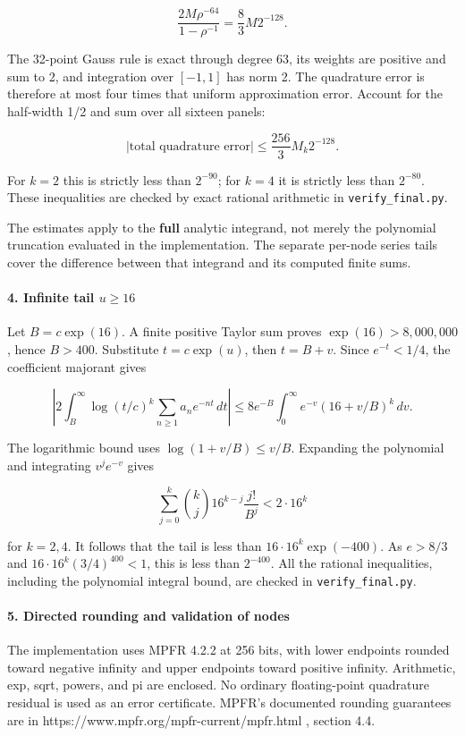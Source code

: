\documentclass[11pt]{article}
\begin{document}
\[
\frac{2M\rho^{-64}}{1-\rho^{-1}}=\frac83 M2^{-128}.
\]

The 32-point Gauss rule is exact through degree 63, its weights are positive and sum to 2, and integration over \([-1,1]\) has norm 2. The quadrature error is therefore at most four times that uniform approximation error. Account for the half-width 1/2 and sum over all sixteen panels:

\[
|\text{total quadrature error}|\le \frac{256}{3}M_k2^{-128}.
\]

For \(k=2\) this is strictly less than \(2^{-90}\); for \(k=4\) it is strictly less than \(2^{-80}\). These inequalities are checked by exact rational arithmetic in \nolinkurl{verify_final.py}.

The estimates apply to the \textbf{full} analytic integrand, not merely the polynomial truncation evaluated in the implementation. The separate per-node series tails cover the difference between that integrand and its computed finite sums.

\paragraph{\texorpdfstring{4. Infinite tail \(u\ge16\)}{4. Infinite tail u\textbackslash ge16}}

Let \(B=c\exp(16)\). A finite positive Taylor sum proves \(\exp(16)>8{,}000{,}000\), hence \(B>400\). Substitute \(t=c\exp(u)\), then \(t=B+v\). Since \(e^{-t}<1/4\), the coefficient majorant gives

\[
\left|2\int_B^\infty\log(t/c)^k\sum_{n\ge1}a_n e^{-nt}\,dt\right|
\le8e^{-B}\int_0^\infty e^{-v}(16+v/B)^k\,dv.
\]

The logarithmic bound uses \(\log(1+v/B)\le v/B\). Expanding the polynomial and integrating \(v^je^{-v}\) gives

\[
\sum_{j=0}^k {k\choose j}16^{k-j}\frac{j!}{B^j}<2\cdot16^k
\]

for \(k=2,4\). It follows that the tail is less than \(16\cdot16^k\exp(-400)\). As \(e>8/3\) and \(16\cdot16^k(3/4)^{400}<1\), this is less than \(2^{-400}\). All the rational inequalities, including the polynomial integral bound, are checked in \nolinkurl{verify_final.py}.

\paragraph{5. Directed rounding and validation of nodes}

The implementation uses MPFR 4.2.2 at 256 bits, with lower endpoints rounded toward negative infinity and upper endpoints toward positive infinity. Arithmetic, exp, sqrt, powers, and pi are enclosed. No ordinary floating-point quadrature residual is used as an error certificate. MPFR's documented rounding guarantees are in https://www.mpfr.org/mpfr-current/mpfr.html , section 4.4.
\end{document}
